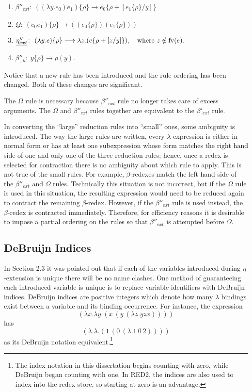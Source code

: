 \begin{enumerate}
\item \(\underline{\beta''_{ext}}\colon\ ((\lambda y.e_0)e_1)\{\rho\}\longrightarrow e_0\{\rho+[e_1\{\rho\}/y]\}\)
\item \(\underline{\Omega}\colon\ (e_0e_1)\{\rho\}\longrightarrow ((e_0\{\rho\})(e_1\{\rho\}))\)
\item \(\underline{\eta''_{ext}}\colon\ (\lambda y.e)\{\rho\}\longrightarrow\lambda z.(e\{\rho+[z/y]\}),
\quad\text{where }z\notin\fv(e).\)
\item \(\underline{\beta''_h}\colon\  y\{\rho\}\longrightarrow\rho(y)\).
\end{enumerate}

Notice that a new rule has been introduced and the rule ordering has been
changed. Both of these changes are significant.

The \(\Omega\) rule is necessary because \(\beta''_{ext}\) rule no longer takes
care of excess arguments. The \(\Omega\) and \(\beta''_{ext}\) rules together
are equivalent to the \(\beta'_{ext}\) rule.

In converting the ``large'' reduction rules into ``small'' ones, some ambiguity
is introduced. The way the large rules are written, every \(\lambda\)-expression
is either in normal form or has at least one subexpression whose form matches
the right hand side of one and only one of the three reduction rules; hence,
once a redex is selected for contraction there is no ambiguity about which rule
to apply. This is not true of the small rules. For example, \(\beta\)-redexes
match the left hand side of the \(\beta''_{ext}\) and \(\Omega\) rules.
Technically this situation is not incorrect, but if the \(\Omega\) rule is used
in this situation, the resulting expression would need to be reduced again to
contract the remaining \(\beta\)-redex. However, if the \(\beta''_{ext}\) rule
is used instead, the \(\beta\)-redex is contracted immediately. Therefore, for
efficiency reasons it is desirable to impose a partial ordering on the rules so
that \(\beta''_{ext}\) is attempted before \(\Omega\).

\subsection{DeBruijn Indices}

In Section 2.3 it was pointed out that if each of the variables introduced
during \(\eta\)-extension is unique there will be no name clashes. One method of
guaranteeing each introduced variable is unique is to replace variable
identifiers with DeBruijn indices. DeBruijn indices are positive integers which
denote how many \(\lambda\) bindings exist between a variable and its binding
occurrence. For instance, the expression
\[
(\lambda x.\lambda y.(x\ (y\ (\lambda z.yzx))))
\]
has
\[
(\lambda.\lambda.(1\ (0\ (\lambda.1\ 0\ 2))))
\]
as its DeBruijn notation equivalent.\footnote{The index notation in this
dissertation begins counting with zero, while DeBruijn began counting with one.
In RED2, the indices are also used to index into the redex store, so starting at
zero is an advantage.}


